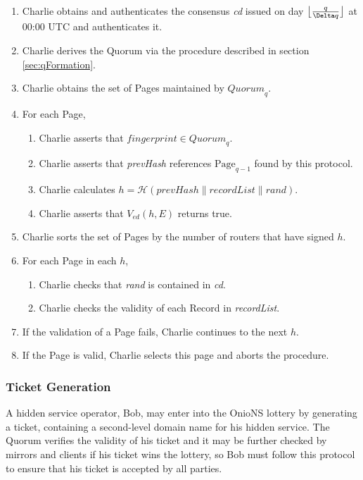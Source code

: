 \documentclass[USenglish,oneside,twocolumn]{article}
\DeclarePairedDelimiter{\floor}{\lfloor}{\rfloor}
\newcommand*\concat{\mathbin{\|}}
\begin{document}
\begin{enumerate}
	\item Charlie obtains and authenticates the consensus \emph{cd} issued on day $ \floor[\big]{\frac{q}{\Delta q}} $ at 00:00 UTC and authenticates it.
	\item Charlie derives the Quorum via the procedure described in section \ref{sec:qFormation}.
	\item Charlie obtains the set of Pages maintained by $ \mathit{Quorum}_{q} $.
	\item For each Page,
		\begin{enumerate}
			\item Charlie asserts that $ \mathit{fingerprint} \in \mathit{Quorum}_{q} $.
			\item Charlie asserts that \emph{prevHash} references $ \mathrm{Page}_{q-1} $ found by this protocol.
			\item Charlie calculates $ h = \mathcal{H}(\mathit{prevHash} \concat \mathit{recordList} \concat \mathit{rand}) $.
			\item Charlie asserts that $ V_{\mathit{ed}}(h, E) $ returns true.
		\end{enumerate}
	\item Charlie sorts the set of Pages by the number of routers that have signed $ h $.
	\item For each Page in each $ h $,
		\begin{enumerate}
			\item Charlie checks that \emph{rand} is contained in \emph{cd}.
			\item Charlie checks the validity of each Record in \emph{recordList}.
		\end{enumerate}
	\item If the validation of a Page fails, Charlie continues to the next $ h $.
	\item If the Page is valid, Charlie selects this page and aborts the procedure.
\end{enumerate}



\subsubsection{Ticket Generation} %
\label{sec:ticketGeneration}

A hidden service operator, Bob, may enter into the OnioNS lottery by generating a ticket, containing a second-level domain name for his hidden service. The Quorum verifies the validity of his ticket and it may be further checked by mirrors and clients if his ticket wins the lottery, so Bob must follow this protocol to ensure that his ticket is accepted by all parties.
\end{document}

